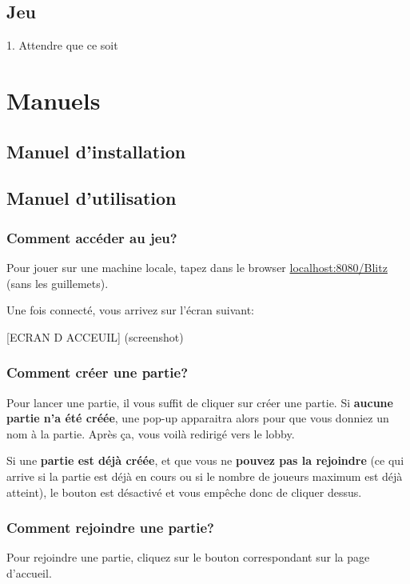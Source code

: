 \documentclass[11pt]{scrreprt}
\let\oldtabularx\tabularx
\let\endoldtabularx\endtabularx
\renewenvironment{tabularx}{\rowcolors{2}{white}{lightgray}\oldtabularx}{\endoldtabularx}
\begin{document}
    \section{Jeu}
    \begin{table}[H]
        \begin{tabularx}{\textwidth}{X|X}
            1. Attendre que ce soit
        \end{tabularx}
    \end{table}

    \chapter{Manuels}
    \section{Manuel d'installation}

    \section{Manuel d'utilisation}
    \subsection{Comment accéder au jeu?}
    Pour jouer sur une machine locale, tapez dans le browser \og \url{localhost:8080/Blitz}\fg{} (sans les guillemets).

    Une fois connecté, vous arrivez sur l'écran suivant:

    [ECRAN D ACCEUIL] (screenshot)

    \subsection{Comment créer une partie?}
    Pour lancer une partie, il vous suffit de cliquer sur créer une partie.
    Si \textbf{aucune partie n'a été créée}, une pop-up apparaitra alors pour que vous donniez un nom à la partie. Après ça, vous voilà redirigé vers le lobby.

    Si une \textbf{partie est déjà créée}, et que vous ne \textbf{pouvez pas la rejoindre} (ce qui arrive si la partie est déjà en cours ou si le nombre de joueurs maximum est déjà atteint), le bouton est désactivé et vous empêche donc de cliquer dessus.

    \subsection{Comment rejoindre une partie?}
    Pour rejoindre une partie, cliquez sur le bouton correspondant sur la page d'accueil.
\end{document}
